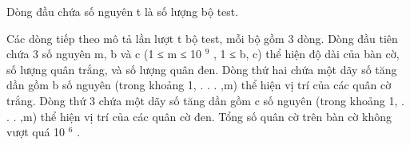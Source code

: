Dòng đầu chứa số nguyên t là số lượng bộ test.  

   Các dòng tiếp theo mô tả lần lượt t bộ test, mỗi bộ gồm 3 dòng. Dòng đầu tiên chứa 3 số nguyên m, b và c (1 ≤ m ≤ 10   $^    9   $   , 1 ≤ b, c) thể hiện độ dài của bàn cờ, số lượng quân trắng, và số lượng quân đen. Dòng thứ hai chứa một dãy số tăng dần gồm b số nguyên (trong khoảng 1, . . . ,m) thể hiện vị trí của các quân cờ trắng. Dòng thứ 3 chứa một dãy số tăng dần gồm c số nguyên (trong khoảng 1, . . . ,m) thể hiện vị trí của các quân cờ đen. Tổng số quân cờ trên bàn cờ không vượt quá 10   $^    6   $   .  

\